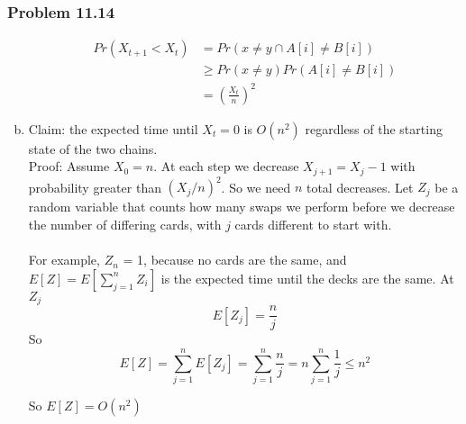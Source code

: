 \documentclass[12pt,letterpaper]{article}
\newenvironment{answer}[1]{
  \subsubsection*{Problem #1}
}{\newpage}
\begin{document}
\begin{answer}{11.14}
\begin{enumerate}[(a)]
		\begin{align*}
			Pr(X_{t+1} < X_t) &= Pr(x \ne y \cap A[i] \ne B[i]) \\
				&\ge Pr(x \ne y)Pr(A[i] \ne B[i]) \\
				&= \left(\frac{X_t}{n}\right)^2
		\end{align*}

	\item Claim: the expected time until $X_t = 0$ is $O(n^2)$ regardless of the starting state of the two chains.\\
	Proof: Assume $X_0 = n$. At each step we decrease $X_{j + 1} = X_{j} - 1$ with probability greater than $(X_j/n)^2$. So we need $n$ total decreases. Let $Z_j$ be a random variable that counts how many swaps we perform before we decrease the number of differing cards, with $j$ cards different to start with.\\\\

	For example, $Z_n$ = 1, because no cards are the same, and $E[Z] = E[\sum_{j=1}^n Z_i]$ is the expected time until the decks are the same. At $Z_j$
		 $$ E[Z_j] = \frac{n}{j} $$
	So
		$$ E[Z] = \sum_{j=1}^n E[Z_j] = \sum_{j=1}^n \frac{n}{j} = n \sum_{j=1}^n \frac{1}{j} \le n^2 $$

	So $E[Z] = O(n^2)$
\end{enumerate}
\end{answer}
\end{document}
